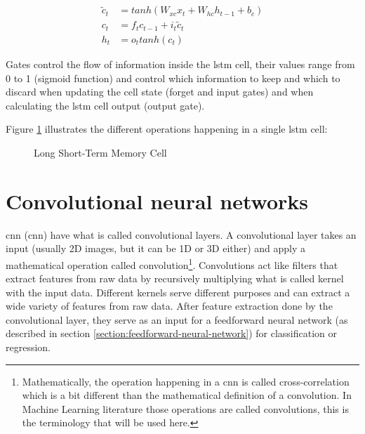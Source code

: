 \begin{align}
    \tilde{c}_t &= tanh(W_{xc}x_t+W_{hc}h_{t-1}+b_c) \label{equation:lstm_candidate_cell_state} \\
    c_t &= f_tc_{t-1}+i_t\tilde{c}_t \label{equation:lstm_cell_state}\\
    h_t &= o_ttanh(c_t) \label{equation:lstm_hidden_state}
\end{align}

Gates control the flow of information inside the \acrshort{lstm} cell, their values range from 0 to 1 (sigmoid function) and control which information to keep and which to discard when updating the cell state (forget and input gates) and when calculating the \acrshort{lstm} cell output (output gate).

Figure \ref{fig:lstm} illustrates the different operations happening in a single \acrshort{lstm} cell:

\begin{figure}[h]
    \centering
    
    \caption{Long Short-Term Memory Cell}
    \label{fig:lstm}
\end{figure}

\section{Convolutional neural networks}
\label{section:cnn}
\acrlong{cnn} (\acrshort{cnn}) have what is called convolutional layers. A convolutional layer takes an input (usually 2D images, but it can be 1D or 3D either) and apply a mathematical operation called convolution\footnote{Mathematically, the operation happening in a \acrshort{cnn} is called cross-correlation which is a bit different than the mathematical definition of a convolution. In Machine Learning literature those operations are called convolutions, this is the terminology that will be used here.}. Convolutions act like filters that extract features from raw data by recursively multiplying what is called kernel with the input data. Different kernels serve different purposes and can extract a wide variety of features from raw data. After feature extraction done by the convolutional layer, they serve as an input for a feedforward neural network (as described in section \ref{section:feedforward-neural-network}) for classification or regression.

